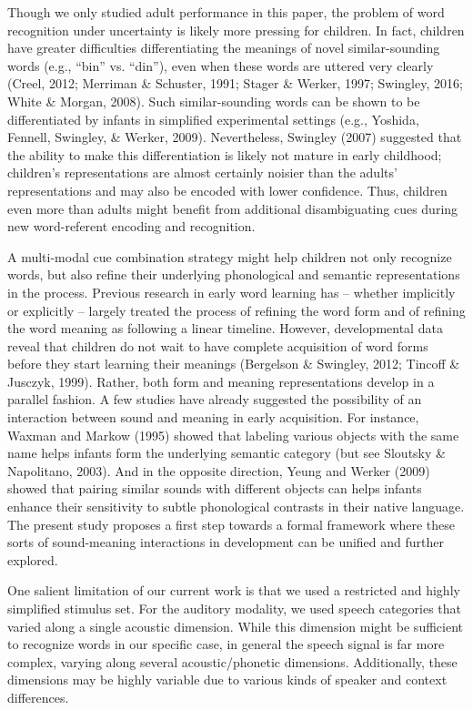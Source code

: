 \documentclass[english,,man,floatsintext]{apa6}
\theoremstyle{definition}
\theoremstyle{definition}
\theoremstyle{definition}
\theoremstyle{remark}
\begin{document}
Though we only studied adult performance in this paper, the problem of
word recognition under uncertainty is likely more pressing for children.
In fact, children have greater difficulties differentiating the meanings
of novel similar-sounding words (e.g., \enquote{bin} vs. \enquote{din}),
even when these words are uttered very clearly (Creel, 2012; Merriman \&
Schuster, 1991; Stager \& Werker, 1997; Swingley, 2016; White \& Morgan,
2008). Such similar-sounding words can be shown to be differentiated by
infants in simplified experimental settings (e.g., Yoshida, Fennell,
Swingley, \& Werker, 2009). Nevertheless, Swingley (2007) suggested that
the ability to make this differentiation is likely not mature in early
childhood; children's representations are almost certainly noisier than
the adults' representations and may also be encoded with lower
confidence. Thus, children even more than adults might benefit from
additional disambiguating cues during new word-referent encoding and
recognition.

A multi-modal cue combination strategy might help children not only
recognize words, but also refine their underlying phonological and
semantic representations in the process. Previous research in early word
learning has -- whether implicitly or explicitly -- largely treated the
process of refining the word form and of refining the word meaning as
following a linear timeline. However, developmental data reveal that
children do not wait to have complete acquisition of word forms before
they start learning their meanings (Bergelson \& Swingley, 2012; Tincoff
\& Jusczyk, 1999). Rather, both form and meaning representations develop
in a parallel fashion. A few studies have already suggested the
possibility of an interaction between sound and meaning in early
acquisition. For instance, Waxman and Markow (1995) showed that labeling
various objects with the same name helps infants form the underlying
semantic category (but see Sloutsky \& Napolitano, 2003). And in the
opposite direction, Yeung and Werker (2009) showed that pairing similar
sounds with different objects can helps infants enhance their
sensitivity to subtle phonological contrasts in their native language.
The present study proposes a first step towards a formal framework where
these sorts of sound-meaning interactions in development can be unified
and further explored.

One salient limitation of our current work is that we used a restricted
and highly simplified stimulus set. For the auditory modality, we used
speech categories that varied along a single acoustic dimension. While
this dimension might be sufficient to recognize words in our specific
case, in general the speech signal is far more complex, varying along
several acoustic/phonetic dimensions. Additionally, these dimensions may
be highly variable due to various kinds of speaker and context
differences.
\end{document}
